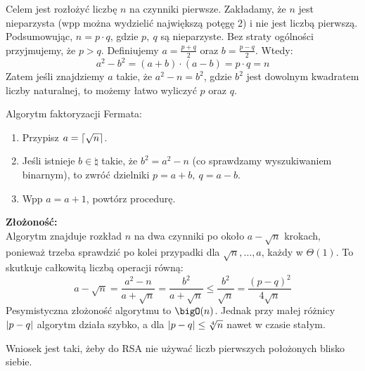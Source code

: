 Celem jest rozłożyć liczbę \( n \) na czynniki pierwsze. Zakładamy, że \( n \) jest nieparzysta (wpp można wydzielić największą potęgę 2) i nie jest liczbą pierwszą.
Podsumowując, \( n = p \cdot q \), gdzie \( p, \ q \) są nieparzyste. Bez straty ogólności przyjmujemy, że \( p > q \). Definiujemy \( a = \frac{p+q}{2} \) oraz \( b = \frac{p-q}{2} \). Wtedy:
\[
    a^2 - b^2 = (a+b) \cdot (a-b) = p \cdot q = n
\]
Zatem jeśli znajdziemy \( a \) takie, że \( a^2 - n = b^2 \), gdzie \( b^2 \) jest dowolnym kwadratem liczby naturalnej, to możemy łatwo wyliczyć \( p \) oraz \( q \).

\begin{greyframe}
    Algorytm faktoryzacji Fermata:
    \begin{enumerate}
        \item Przypisz \( a = \left\lceil\sqrt{n}\right\rceil \).
        \item Jeśli istnieje \( b \in \natural \) takie, że \( b^2 = a^2 - n \) (co sprawdzamy wyszukiwaniem binarnym), to zwróć dzielniki \( p = a+b, \ q = a-b \).
        \item Wpp \( a = a + 1\), powtórz procedurę.
    \end{enumerate}
\end{greyframe}

\textbf{Złożoność:} \\
Algorytm znajduje rozkład \( n \) na dwa czynniki po około \( a - \sqrt{n} \) krokach, ponieważ trzeba sprawdzić po kolei przypadki dla \( \sqrt{n}, \dots, a \), każdy w \( \Theta(1) \).
To skutkuje całkowitą liczbą operacji równą:
\[
    a - \sqrt{n} = \frac{a^2 - n}{a + \sqrt{n}} = \frac{b^2}{a + \sqrt{n}} \leq \frac{b^2}{\sqrt{n}} = \frac{(p-q)^2}{4\sqrt{n}}
\]
Pesymistyczna złożoność algorytmu to \( \bigO(n) \). Jednak przy małej różnicy \( \left\lvert p - q\right\rvert \) algorytm działa szybko, a dla  \( \left\lvert p-q\right\rvert \leq \sqrt[4]{n} \) nawet w czasie stałym.

Wniosek jest taki, żeby do RSA nie używać liczb pierwszych położonych blisko siebie.